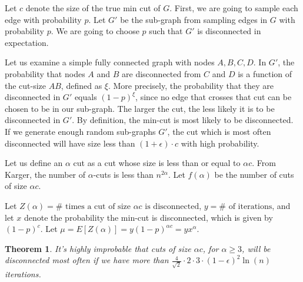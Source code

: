 \documentclass{article}
\newtheorem{theorem}{Theorem}
\begin{document}
Let $c$ denote the size of the true min cut of $G$. First, we are going to sample each edge with probability $p$. Let $G'$ be the sub-graph from sampling edges in $G$ with probability $p$. We are going to choose $p$ such that $G'$ is disconnected in expectation.

Let us examine a simple fully connected graph with nodes $A, B, C, D$.  In $G'$, the probability that nodes $A$ and $B$ are disconnected from $C$ and $D$ is a function of the cut-size $AB$, defined as $\xi$. More precisely, the probability that they are disconnected in $G'$ equals $(1-p)^\xi$, since no edge that crosses that cut can be chosen to be in our sub-graph. The larger the cut, the less likely it is to be disconnected in $G'$. By definition, the min-cut is most likely to be disconnected. If we generate enough random sub-graphs $G'$, the cut which is most often disconnected will have size less than $(1+\epsilon) \cdot c$ with high probability.

Let us define an $\alpha$ cut as a cut whose size is less than or equal to $\alpha c$. From Karger\cite{Karger}, the number of $\alpha$-cuts is less than $n^{2 \alpha}$. Let $f(\alpha)$ be the number of cuts of size $\alpha c$.

Let $Z(\alpha) = \# \text{ times a cut of size } \alpha c \text{ is disconnected}$, $y = \# \text{ of iterations}$, and let $x$ denote the probability the min-cut is disconnected, which is given by $(1 - p)^c$. Let $\mu = E[Z(\alpha)] = y(1-p)^{\alpha c} = yx^\alpha$.

\begin{theorem} It's highly improbable that cuts of size $\alpha c$, for $\alpha \geq 3$, will be disconnected most often if we have more than $\frac{4}{\sqrt{2}} \cdot 2 \cdot 3 \cdot (1-\epsilon)^2 \ln{(n)}$ iterations.
\end{theorem}
\end{document}
